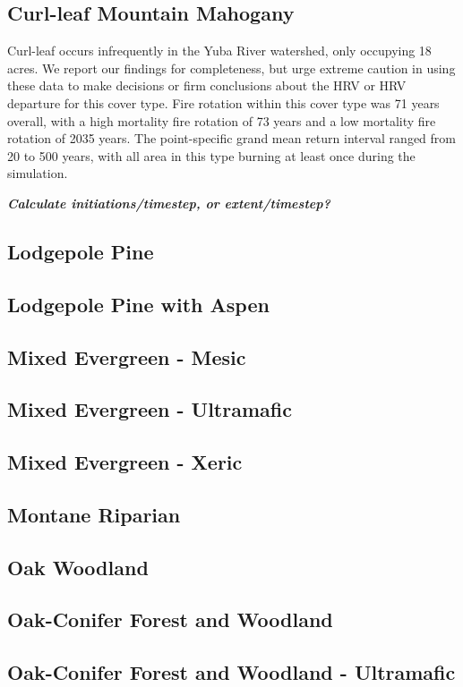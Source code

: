 \subsection{Curl-leaf Mountain Mahogany}
Curl-leaf occurs infrequently in the Yuba River watershed, only occupying 18 acres. We report our findings for completeness, but urge extreme caution in using these data to make decisions or firm conclusions about the HRV or HRV departure for this cover type. Fire rotation within this cover type was 71 years overall, with a high mortality fire rotation of 73 years and a low mortality fire rotation of 2035 years. The point-specific grand mean return interval ranged from 20 to 500 years, with all area in this type burning at least once during the simulation.

\emph{\textbf{Calculate initiations/timestep, or extent/timestep?}}



\subsection{Lodgepole Pine} 
\subsection{Lodgepole Pine with Aspen} 
\subsection{Mixed Evergreen - Mesic} 
\subsection{Mixed Evergreen - Ultramafic} 
\subsection{Mixed Evergreen - Xeric} 
\subsection{Montane Riparian} 
\subsection{Oak Woodland} 
\subsection{Oak-Conifer Forest and Woodland} 
\subsection{Oak-Conifer Forest and Woodland - Ultramafic} 
